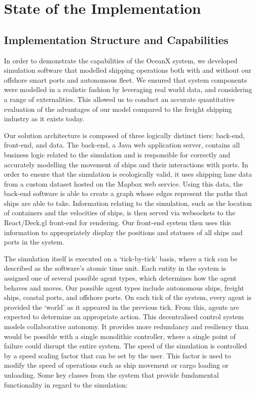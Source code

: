 \newpage
\section{State of the Implementation}

\subsection{Implementation Structure and Capabilities}

In order to demonstrate the capabilities of the OceanX system, we developed simulation software that modelled shipping operations both with and without our offshore smart ports and autonomous fleet. We ensured that system components were modelled in a realistic fashion by leveraging real world data, and considering a range of externalities. This allowed us to conduct an accurate quantitative evaluation of the advantages of our model compared to the freight shipping industry as it exists today.

Our solution architecture is composed of three logically distinct tiers: back-end, front-end, and data. The back-end, a Java web application server, contains all business logic related to the simulation and is responsible for correctly and accurately modelling the movement of ships and their interactions with ports. In order to ensure that the simulation is ecologically valid, it uses shipping lane data from a custom dataset hosted on the Mapbox web service. Using this data, the back-end software is able to create a graph whose edges represent the paths that ships are able to take. Information relating to the simulation, such as the location of containers and the velocities of ships, is then served via websockets to the React/Deck.gl front-end for rendering. Our front-end system then uses this information to appropriately display the positions and statuses of all ships and ports in the system.

The simulation itself is executed on a `tick-by-tick’ basis, where a tick can be described as the software’s atomic time unit. Each entity in the system is assigned one of several possible agent types, which determines how the agent behaves and moves. Our possible agent types include autonomous ships, freight ships, coastal ports, and offshore ports. On each tick of the system, every agent is provided the ‘world’ as it appeared in the previous tick. From this, agents are expected to determine an appropriate action. This decentralised control system models collaborative autonomy. It provides more redundancy and resiliency than would be possible with a single monolithic controller, where a single point of failure could disrupt the entire system. The speed of the simulation is controlled by a speed scaling factor that can be set by the user. This factor is used to modify the speed of operations such as ship movement or cargo loading or unloading. Some key classes from the system that provide fundamental functionality in regard to the simulation:

